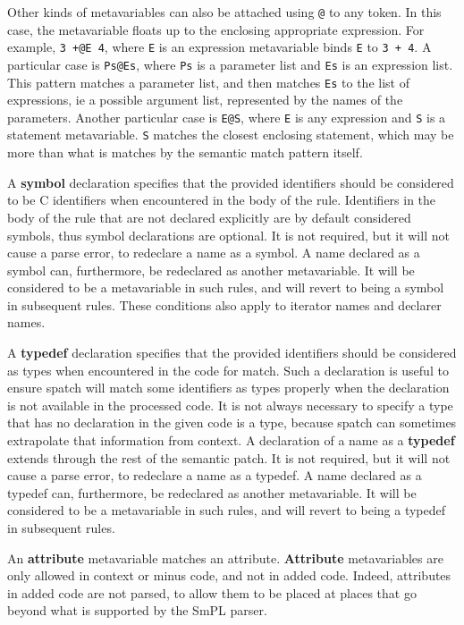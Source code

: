 Other kinds of metavariables can also be attached using \texttt{@} to any
token.  In this case, the metavariable floats up to the enclosing
appropriate expression.  For example, {\tt 3 +@E 4}, where {\tt E} is an
expression metavariable binds {\tt E} to {\tt 3 + 4}.  A particular case is
{\tt Ps@Es}, where {\tt Ps} is a parameter list and {\tt Es} is an
expression list.  This pattern matches a parameter list, and then matches
{\tt Es} to the list of expressions, ie a possible argument list,
represented by the names of the parameters.  Another particular case is
{\tt E@S}, where {\tt E} is any expression and {\tt S} is a statement
metavariable.  {\tt S} matches the closest enclosing statement, which may
be more than what is matches by the semantic match pattern itself.

A {\bf symbol} declaration specifies that the provided identifiers should
be considered to be C identifiers when encountered in the body of the rule.
Identifiers in the body of the rule that are not declared explicitly are by
default considered symbols, thus symbol declarations are optional. It is
not required, but it will not cause a parse error, to redeclare a name as a
symbol. A name declared as a symbol can, furthermore, be redeclared as another
metavariable. It will be considered to be a metavariable in such rules,
and will revert to being a symbol in subsequent rules. These conditions
also apply to iterator names and declarer names.

A {\bf typedef} declaration specifies that the provided identifiers should be
considered as types when encountered in the code for match. Such a declaration
is useful to ensure spatch will match some identifiers as types properly when
the declaration is not available in the processed code. It is not always
necessary to specify a type that has no declaration in the given code is a type,
because spatch can sometimes extrapolate that information from context.
A declaration of a name as a {\bf typedef} extends through the rest of the
semantic patch. It is not required, but it will not cause a parse error, to
redeclare a name as a typedef. A name declared as a typedef can, furthermore, be
redeclared as another metavariable. It will be considered to be a metavariable
in such rules, and will revert to being a typedef in subsequent rules.

An {\bf attribute} metavariable matches an attribute.  {\bf Attribute}
metavariables are only allowed in context or minus code, and not in added
code.  Indeed, attributes in added code are not parsed, to allow them to be
placed at places that go beyond what is supported by the SmPL parser.


